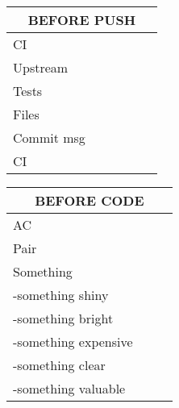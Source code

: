 \documentclass[10pt, twocolumn]{article}
\newenvironment{checklist}[1]{%

\newcommand{\eol}{}

  \renewcommand{\item}[2]{
    ##1\hspace{2em}\dotfill\makebox{\uppercase{##2}}\\
  }

  \newcommand{\step}[1]{%
    \hspace*{10em}-\hspace*{\labelsep}##1\\
  }

  \begin{tabular}{p{0.8\linewidth}}
     \toprule
       \multicolumn{1}{c}{\textbf{\uppercase{#1}}}\\
     \midrule
}{\bottomrule\end{tabular}\vspace{1em}}
\begin{document}
\begin{checklist}{before push}
  \item{CI}{green}
  \item{Upstream}{pull/update}
  \item{Tests}{green}
  \item{Files}{added/stashed}
  \item{Commit msg}{identified}
  \item{CI}{green}
\end{checklist}

\begin{checklist}{before code}
  \item{AC}{clear}
  \item{Pair}{briefed}
  \item{Something}{Else}
    \step{something shiny}
    \step{something bright}
    \step{something expensive}
    \step{something clear}
    \step{something valuable}
\end{checklist}
\end{document}
